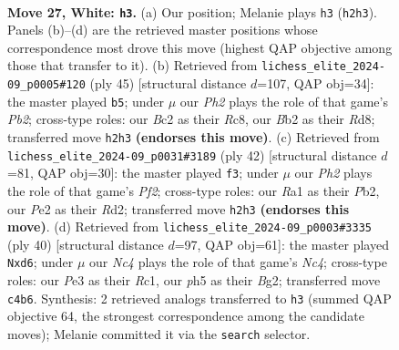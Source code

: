\documentclass[11pt]{article}
\begin{document}
\begin{figure}[p]
\label{fig:thought-m50}
\end{figure}

\clearpage

\begin{figure}[p]\centering
\begin{subfigure}{0.46\textwidth}\centering
\resizebox{\linewidth}{!}{%
\newchessgame
\chessboard[
  setfen={rnb5/1p1n2k1/p2bppp1/3r3p/2N5/1P2P1P1/PBB1PK1P/R3R3 w - - 3 27},
  showmover=false,
  pgfstyle=straightmove, color=movearrow, markmove={h2-h3}
]}
\caption{}
\end{subfigure}\hfill
\begin{subfigure}{0.46\textwidth}\centering
\resizebox{\linewidth}{!}{%
\newchessgame
\chessboard[
  setfen={2rr2k1/pp2pp1p/5bp1/8/1BPPbn2/1P3N1P/R4PP1/3RN1K1 b - - 8 23},
  showmover=false,
  pgfstyle=straightmove, color=movearrow, markmove={b7-b5}
]}
\caption{}
\end{subfigure}
\\[4pt]
\begin{subfigure}{0.46\textwidth}\centering
\resizebox{\linewidth}{!}{%
\newchessgame
\chessboard[
  setfen={r1br4/k3b1p1/1p2pp1p/p2n4/2BBN3/P7/1PPR1PPP/2KR4 w - - 0 22},
  showmover=false,
  pgfstyle=straightmove, color=movearrow, markmove={f2-f3}
]}
\caption{}
\end{subfigure}\hfill
\begin{subfigure}{0.46\textwidth}\centering
\resizebox{\linewidth}{!}{%
\newchessgame
\chessboard[
  setfen={1rb1r1k1/1p3p1p/p2b1npB/2pP3n/P1N5/6P1/1P2PPBP/2R1R1K1 w - - 0 21},
  showmover=false,
  pgfstyle=straightmove, color=movearrow, markmove={c4-d6}
]}
\caption{}
\end{subfigure}
\caption{\textbf{Move 27, White: \texttt{h3}.} (a) Our position; Melanie plays \texttt{h3} (\texttt{h2h3}). Panels (b)--(d) are the retrieved master positions whose correspondence most drove this move (highest QAP objective among those that transfer to it). (b) Retrieved from \texttt{lichess\_elite\_2024-09\_p0005\#120} (ply 45) [structural distance $d$=107, QAP obj=34]: the master played \texttt{b5}; under $\mu$ our \emph{Ph2} plays the role of that game's \emph{Pb2}; cross-type roles: our \emph{B}c2 as their \emph{R}c8, our \emph{B}b2 as their \emph{R}d8; transferred move \texttt{h2h3} \textbf{(endorses this move)}. (c) Retrieved from \texttt{lichess\_elite\_2024-09\_p0031\#3189} (ply 42) [structural distance $d$=81, QAP obj=30]: the master played \texttt{f3}; under $\mu$ our \emph{Ph2} plays the role of that game's \emph{Pf2}; cross-type roles: our \emph{R}a1 as their \emph{P}b2, our \emph{P}e2 as their \emph{R}d2; transferred move \texttt{h2h3} \textbf{(endorses this move)}. (d) Retrieved from \texttt{lichess\_elite\_2024-09\_p0003\#3335} (ply 40) [structural distance $d$=97, QAP obj=61]: the master played \texttt{Nxd6}; under $\mu$ our \emph{Nc4} plays the role of that game's \emph{Nc4}; cross-type roles: our \emph{P}e3 as their \emph{R}c1, our \emph{p}h5 as their \emph{B}g2; transferred move \texttt{c4b6}. Synthesis: 2 retrieved analogs transferred to \texttt{h3} (summed QAP objective 64, the strongest correspondence among the candidate moves); Melanie committed it via the \texttt{search} selector.}

\end{figure}
\end{document}
